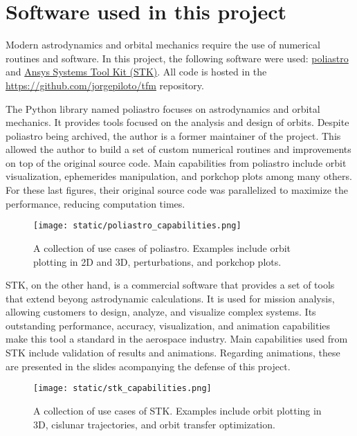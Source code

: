 \section{Software used in this project}

Modern astrodynamics and orbital mechanics require the use of numerical routines
and software. In this project, the following software were used:
\href{https://github.com/poliastro/poliastro}{poliastro} and
\href{https://www.ansys.com/products/missions/ansys-stk}{Ansys Systems Tool Kit
  (STK)}. All code is hosted in the
\href{https://github.com/jorgepiloto/tfm}{https://github.com/jorgepiloto/tfm}
repository.

The Python library named poliastro focuses on astrodynamics and orbital
mechanics. It provides tools focused on the analysis and design of orbits.
Despite poliastro being archived, the author is a former maintainer of the
project. This allowed the author to build a set of custom numerical routines and
improvements on top of the original source code. Main capabilities from
poliastro include orbit visualization, ephemerides manipulation, and porkchop
plots among many others. For these last figures, their original source code was
parallelized to maximize the performance, reducing computation times.

\vspace{1cm}
\begin{figure}[H] \centering
  \texttt{[image: static/poliastro\_capabilities.png]}
  \caption[A collection of use cases of poliastro.]{A collection of use
    cases of poliastro. Examples include orbit plotting in 2D and 3D,
    perturbations, and porkchop plots.}
  \label{fig:poliastro_capabilities}
\end{figure}

STK, on the other hand, is a commercial software that provides a set of tools
that extend beyong astrodynamic calculations. It is used for mission analysis,
allowing customers to design, analyze, and visualize complex systems. Its
outstanding performance, accuracy, visualization, and animation capabilities
make this tool a standard in the aerospace industry. Main capabilities used from
STK include validation of results and animations. Regarding animations, these
are presented in the slides acompanying the defense of this project.

\vspace{1cm}
\begin{figure}[H] \centering
  \texttt{[image: static/stk\_capabilities.png]}
  \caption[A collection of use cases of STK.]{A collection of use
    cases of STK. Examples include orbit plotting in 3D, cislunar
    trajectories, and orbit transfer optimization.}
  \label{fig:stk_capabilities}
\end{figure}
